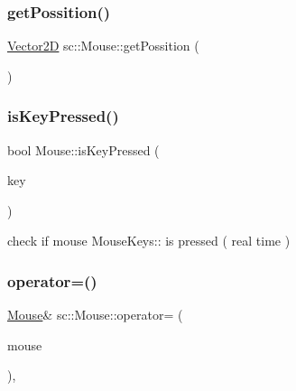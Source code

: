 \mbox{\label{classsc_1_1_mouse_ae71bc5e3211e2ba9935e703cc04e7492}} 
\subsubsection{\texorpdfstring{getPossition()}{getPossition()}}
{\footnotesize\ttfamily \mbox{\hyperlink{classsc_1_1_vector2_d}{Vector2D}} sc\+::\+Mouse\+::get\+Possition (\begin{DoxyParamCaption}{ }\end{DoxyParamCaption})}

\mbox{\label{classsc_1_1_mouse_a55f4069da03cdd14d64c83d668945e9c}} 
\subsubsection{\texorpdfstring{isKeyPressed()}{isKeyPressed()}}
{\footnotesize\ttfamily bool Mouse\+::is\+Key\+Pressed (\begin{DoxyParamCaption}\item[{Mouse\+Keys}]{key }\end{DoxyParamCaption})}



check if mouse Mouse\+Keys\+:\+: is pressed ( real time ) 

\mbox{\label{classsc_1_1_mouse_a7595b361d02ffe2bdb658784f0b29a68}} 
\subsubsection{\texorpdfstring{operator=()}{operator=()}\hspace{0.1cm}{\footnotesize\ttfamily [1/2]}}
{\footnotesize\ttfamily \mbox{\hyperlink{classsc_1_1_mouse}{Mouse}}\& sc\+::\+Mouse\+::operator= (\begin{DoxyParamCaption}\item[{const \mbox{\hyperlink{classsc_1_1_mouse}{Mouse}} \&}]{mouse }\end{DoxyParamCaption})\hspace{0.3cm}{\ttfamily [private]}, {\ttfamily [delete]}}

